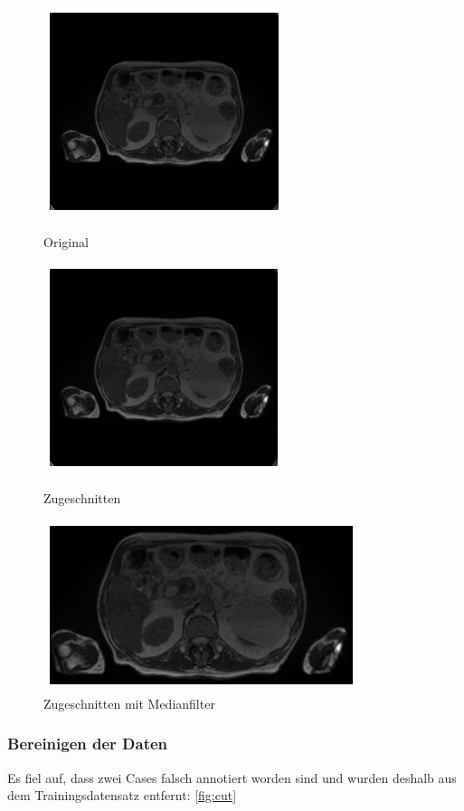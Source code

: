 \begin{figure}[htp]
\centering
\includegraphics[width=.25\textwidth]{bilder/orig}\hfill
\caption{Original}
\includegraphics[width=.25\textwidth]{bilder/crop}\hfill
\caption{Zugeschnitten}
\includegraphics[width=.25\textwidth]{bilder/crop_median}
\caption{Zugeschnitten mit Medianfilter}
\label{fig:crop}
\end{figure}

\begin{table}[]
 \begin{center}
\caption{Ausschnitt aus der Zuschnitt-Tabelle}\label{fig:crop_table}
 \end{center}
\end{table}

\subsubsection{Bereinigen der Daten}

Es fiel auf, dass zwei Cases falsch annotiert worden sind und wurden deshalb aus dem Trainingsdatensatz entfernt: \autoref{fig:cut}

